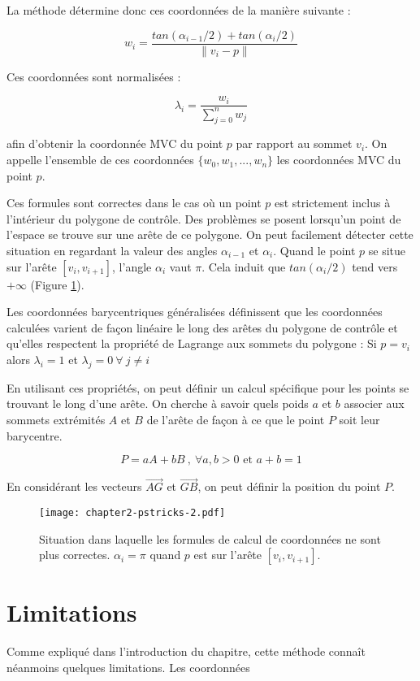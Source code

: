 La méthode détermine donc ces coordonnées de la manière suivante :

\begin{equation}
  w_i = \frac{tan(\alpha_{i-1}/2) + tan(\alpha_i/2)}{\| v_i - p \|}
\end{equation}

Ces coordonnées sont normalisées :

\begin{equation}
  \lambda_i = \frac{w_i}{\sum_{j=0}^n w_j}
\end{equation}

afin d'obtenir la coordonnée MVC du point $p$ par rapport au sommet $v_i$. On
appelle l'ensemble de ces coordonnées $\{w_0, w_1, ..., w_n\}$ les coordonnées
MVC du point $p$.

Ces formules sont correctes dans le cas où un point $p$ est strictement inclus à
l'intérieur du polygone de contrôle. Des problèmes se posent lorsqu'un point de
l'espace se trouve sur une arête de ce polygone. On peut facilement détecter
cette situation en regardant la valeur des angles $\alpha_{i-1}$ et $\alpha_i$.
Quand le point $p$ se situe sur l'arête $[v_i,v_{i+1}]$, l'angle $\alpha_i$ vaut
$\pi$. Cela induit que $tan(\alpha_i/2)$ tend vers $+\infty$ (Figure
\ref{DEFinc}).

Les coordonnées barycentriques généralisées définissent que les coordonnées
calculées varient de façon linéaire le long des arêtes du polygone de contrôle
et qu'elles respectent la propriété de Lagrange aux sommets du polygone : Si $p
= v_i$ alors $\lambda_i = 1$ et $\lambda_j = 0 ~\forall~ j \neq i$ 

En utilisant ces propriétés, on peut définir un calcul spécifique pour les
points se trouvant le long d'une arête. On cherche à savoir quels poids $a$ et
$b$ associer aux sommets extrémités $A$ et $B$ de l'arête de façon à ce que le point
$P$ soit leur barycentre.

\begin{equation}
  P = aA + bB ~,~ \forall a,b > 0 \text{ et } a+b = 1
\end{equation}

En considérant les vecteurs $\overrightarrow{AG}$ et $\overrightarrow{GB}$, on
peut définir la position du point $P$.

\begin{figure}[ht]
  \begin{center}
    \texttt{[image: chapter2-pstricks-2.pdf]}
    \caption{Situation dans laquelle les formules de calcul de coordonnées ne
    sont plus correctes. $\alpha_i = \pi$ quand $p$ est sur l'arête
    $[v_i,v_{i+1}]$.}
    \label{DEFinc}
  \end{center}
\end{figure}

\section{Limitations}

Comme expliqué dans l'introduction du chapitre, cette méthode connaît néanmoins
quelques limitations. Les coordonnées